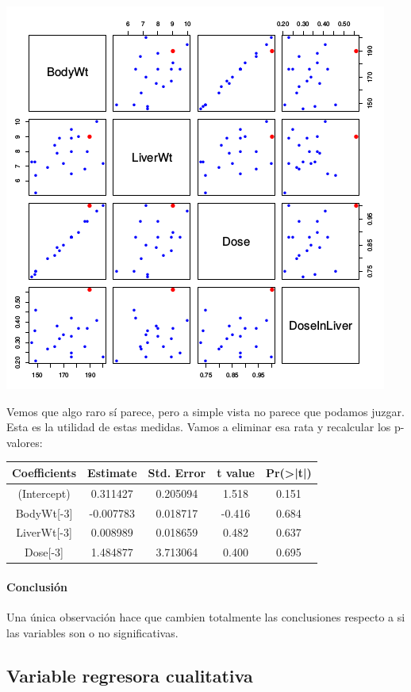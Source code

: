 \begin{center}
\includegraphics[scale=0.6]{img/DiagramaRatasRojo.png}
\end{center}

Vemos que algo raro sí parece, pero a simple vista no parece que podamos juzgar. Esta es la utilidad de estas medidas. Vamos a eliminar esa rata y recalcular los p-valores:

\begin{center}
\begin{tabular}{ccccc}
Coefficients&Estimate&Std. Error&t value&Pr(>|t|)\\\hline
(Intercept)&0.311427&0.205094&1.518&0.151\\
BodyWt[-3]&-0.007783&0.018717&-0.416&0.684\\
LiverWt[-3]&0.008989&0.018659&0.482&0.637\\
Dose[-3]&1.484877&3.713064&0.400&0.695
\end{tabular}
\end{center}

\paragraph{Conclusión}
Una única observación hace que cambien totalmente las conclusiones respecto a si las variables son o no significativas.


\subsection{Variable regresora cualitativa}

